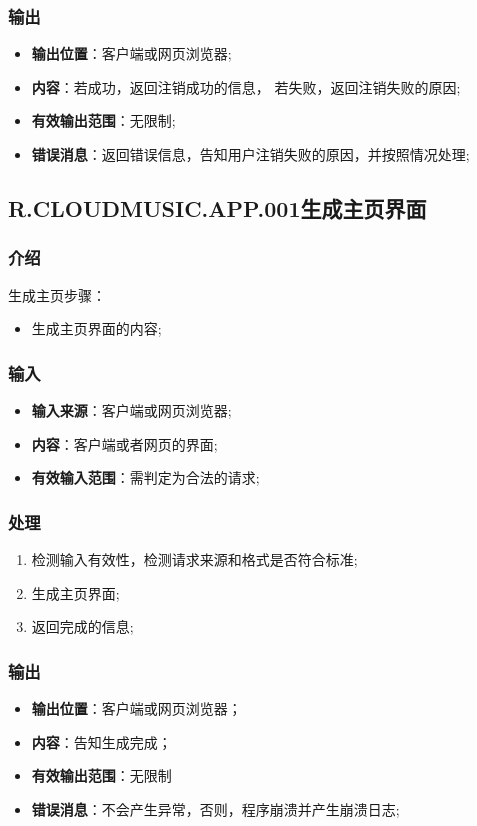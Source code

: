 \subsubsection{输出}
\begin{itemize}
	\item \textbf{输出位置}：客户端或网页浏览器;
	\item \textbf{内容}：若成功，返回注销成功的信息，
		若失败，返回注销失败的原因;
	\item \textbf{有效输出范围}：无限制;
	\item \textbf{错误消息}：返回错误信息，告知用户注销失败的原因，并按照情况处理;
\end{itemize}

\subsection{R.CLOUDMUSIC.APP.001生成主页界面}
\subsubsection{介绍}
生成主页步骤：
	\begin{itemize}
		\item 生成主页界面的内容;
	\end{itemize}
\subsubsection{输入}
	\begin{itemize}
		\item \textbf{输入来源}：客户端或网页浏览器;
		\item \textbf{内容}：客户端或者网页的界面;
		\item \textbf{有效输入范围}：需判定为合法的请求;
	\end{itemize}
\subsubsection{处理}
	\begin{enumerate}
		\item 检测输入有效性，检测请求来源和格式是否符合标准;
		\item 生成主页界面;
		\item 返回完成的信息;
	\end{enumerate}
\subsubsection{输出}
\begin{itemize}
	\item \textbf{输出位置}：客户端或网页浏览器；
	\item \textbf{内容}：告知生成完成；
	\item \textbf{有效输出范围}：无限制
	\item \textbf{错误消息}：不会产生异常，否则，程序崩溃并产生崩溃日志;
\end{itemize}

